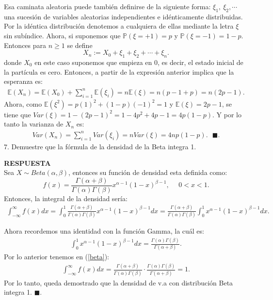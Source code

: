 \documentclass[11pt,letterpaper]{article}
\newcommand{\mP}{\mathbb{P}}
\newcommand{\mE}{\mathbb{E}}
\newcommand{\res}{\textbf{RESPUESTA}\\}
\newcommand{\fin}{$\blacksquare.$}
\newcommand{\finf}{\blacksquare.}
\begin{document}
Esa caminata aleatoria puede también definirse de la siguiente forma: $\xi_1, \ \xi_2,\cdots$ una sucesión de variables aleatorias independientes e idénticamente distribuidas. Por la idéntica distribución denotemos a cualquiera de ellas mediante la letra $\xi$ sin subíndice. Ahora, si suponemos que $\mP(\xi=+1)=p$ y $\mP(\xi=-1)=1-p$. Entonces para $n\geq 1$ se define 
$$X_n:=X_0+\xi_1+\xi_2+\cdots+\xi_n.$$
donde $X_0$ en este caso suponemos que empieza en 0, es decir, el estado inicial de la partícula es cero. Entonces, a partir de la expresión anterior implica que la esperanza es:
\begin{align*}
\mE(X_n)=\mE(X_0)+\sum_{i=1}^n \mE(\xi_i)=n\mE(\xi)=n(p-1+p)=n(2p-1).
\end{align*}
Ahora, como $\mE(\xi^2)=p(1)^2+(1-p)(-1)^2=1$ y $\mE(\xi)=2p-1$, se tiene que $Var(\xi)=1-(2p-1)^2=1-4p^2+4p-1=4p(1-p)$. Y por lo tanto la varianza de $X_n$ es:
\begin{align*}
Var(X_n)=\sum_{i=1}^n Var(\xi_i)=nVar(\xi)=4np(1-p). \ \ \ \finf
\end{align*}
7. Demuestre que la fórmula de la densidad de la Beta integra 1.

\res Sea $X\sim Beta(\alpha, \beta)$, entonces su función de densidad esta definida como:
$$f(x)=\frac{\Gamma(\alpha+\beta)}{\Gamma(\alpha)\Gamma(\beta)}x^{\alpha-1}(1-x)^{\beta-1},\ \ \ \ \ \ 0<x<1.$$
Entonces, la integral de la densidad sería:
\begin{align}\label{beta}
\int_{-\infty}^{\infty}f(x)dx=\int_{0}^{1}\frac{\Gamma(\alpha+\beta)}{\Gamma(\alpha)\Gamma(\beta)}x^{\alpha-1}(1-x)^{\beta-1}dx=\frac{\Gamma(\alpha+\beta)}{\Gamma(\alpha)\Gamma(\beta)} \int_{0}^{1}x^{\alpha-1}(1-x)^{\beta-1}dx.
\end{align}

Ahora recordemos una identidad con la función Gamma, la cuál es:
\begin{align*}
\int_{0}^{1}x^{\alpha-1}(1-x)^{\beta-1}dx = \frac{\Gamma(\alpha) \Gamma(\beta)}{\Gamma(\alpha+\beta)}.
\end{align*}
Por lo anterior tenemos en (\ref{beta}):
\begin{align*}
\int_{-\infty}^{\infty}f(x)dx = \frac{\Gamma(\alpha+\beta)}{\Gamma(\alpha)\Gamma(\beta)}\cdot \frac{\Gamma(\alpha) \Gamma(\beta)}{\Gamma(\alpha+\beta)}=1.
\end{align*}
Por lo tanto, queda demostrado que la densidad de v.a con distribución Beta integra 1. \fin
\end{document}
